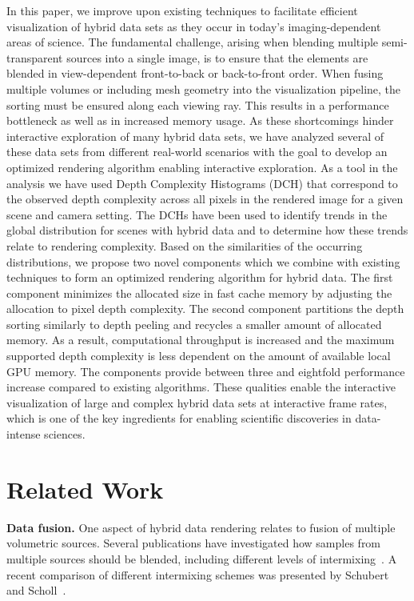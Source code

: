 \documentclass{egpubl}
\newcommand{\green}[1]{{\color{PineGreen}#1}}
\newcommand{\new}[1]{\green{#1}}
\newcommand{\dch}{DCH}
\begin{document}
In this paper, we improve upon existing techniques to facilitate efficient visualization of hybrid data sets as they occur in today's imaging-dependent areas of science. 
The fundamental challenge, arising when blending multiple semi-transparent sources into a single image, is to ensure that the elements are blended in view-dependent front-to-back or back-to-front order. 
When fusing multiple volumes or including mesh geometry into the visualization pipeline, the sorting must be ensured along each viewing ray.
This results in a performance bottleneck as well as in increased memory usage. 
As these shortcomings hinder interactive exploration of many hybrid data sets, we have analyzed several of these data sets from different real-world scenarios with the goal to develop an optimized rendering algorithm enabling interactive exploration. 
As a tool in the analysis we have used {Depth Complexity Histograms} (\dch) that correspond to the observed depth complexity across all pixels in the rendered image for a given scene and camera setting. 
The \dch{}s have been used to identify trends in the global distribution for scenes with hybrid data and to determine how these trends relate to rendering complexity. 
Based on the similarities of the occurring distributions, we propose two novel components which we combine with existing techniques to form an optimized rendering algorithm for hybrid data. 
\new{
The first component minimizes the allocated size in fast cache memory by adjusting the allocation to pixel depth complexity. 
The second component partitions the depth sorting similarly to depth peeling and recycles a smaller amount of allocated memory. 
} 
As a result, computational throughput is increased and the maximum supported depth complexity is less dependent on the amount of available local GPU memory. 
The components provide between three and eightfold performance increase compared to existing algorithms. %
These qualities enable the interactive visualization of large and complex hybrid data sets at interactive frame rates, which is one of the key ingredients for enabling scientific discoveries in data-intense sciences.







\section{Related Work}
\label{sec:related-work}

\noindent\textbf{Data fusion.} 
%
One aspect of hybrid data rendering relates to fusion of multiple volumetric sources.
Several publications have investigated how samples from multiple sources should be blended, including different levels of intermixing~\cite{cai99intermixing}. 
A recent comparison of different intermixing schemes was presented by Schubert and Scholl~\cite{Schubert2011}. 
\end{document}
